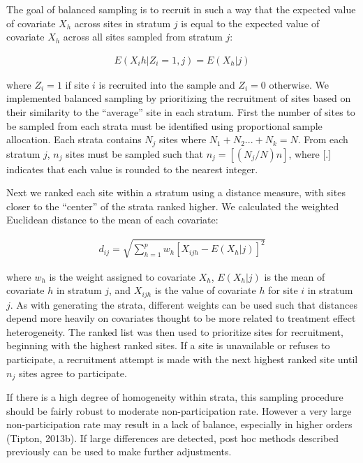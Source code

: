 \documentclass[man,floatsintext]{apa6}
\begin{document}
The goal of balanced sampling is to recruit in such a way that the expected value of covariate \(X_h\) across sites in stratum \(j\) is equal to the expected value of covariate \(X_h\) across all sites sampled from stratum \(j\):

\begin{align}
  E(X_ih|Z_i = 1, j) = E(X_h|j)
\end{align}

where \(Z_i = 1\) if site \(i\) is recruited into the sample and \(Z_i = 0\) otherwise. We implemented balanced sampling by prioritizing the recruitment of sites based on their similarity to the \enquote{average} site in each stratum. First the number of sites to be sampled from each strata must be identified using proportional sample allocation. Each strata contains \(N_j\) sites where \(N_1 + N_2 ... + N_k = N\). From each stratum \(j\), \(n_j\) sites must be sampled such that \(n_j = [(N_j/N)n]\), where {[}.{]} indicates that each value is rounded to the nearest integer.

Next we ranked each site within a stratum using a distance measure, with sites closer to the \enquote{center} of the strata ranked higher. We calculated the weighted Euclidean distance to the mean of each covariate:

\begin{align} \label{eq:euclid}
  d_{ij} = \sqrt{\sum^p_{h=1}w_h[X_{ijh} - E(X_h|j)]^2}
\end{align}

where \(w_h\) is the weight assigned to covariate \(X_h\), \(E(X_h|j)\) is the mean of covariate \(h\) in stratum \(j\), and \(X_{ijh}\) is the value of covariate \(h\) for site \(i\) in stratum \(j\). As with generating the strata, different weights can be used such that distances depend more heavily on covariates thought to be more related to treatment effect heterogeneity. The ranked list was then used to prioritize sites for recruitment, beginning with the highest ranked sites. If a site is unavailable or refuses to participate, a recruitment attempt is made with the next highest ranked site until \(n_j\) sites agree to participate.

If there is a high degree of homogeneity within strata, this sampling procedure should be fairly robust to moderate non-participation rate. However a very large non-participation rate may result in a lack of balance, especially in higher orders (Tipton, 2013b). If large differences are detected, post hoc methods described previously can be used to make further adjustments.
\end{document}
